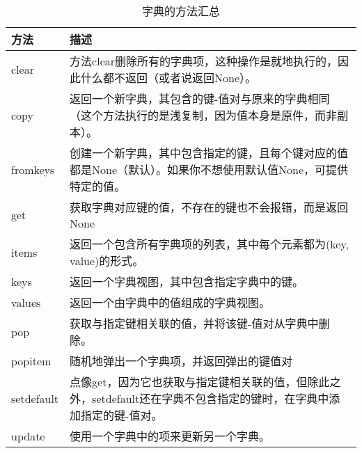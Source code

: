 \begin{table}
    \caption{字典的方法汇总}
    \begin{tabularx}{\textwidth}{lX}
        \hline
        方法         & 描述                                                                \\
        \hline
        clear      & 方法clear删除所有的字典项，这种操作是就地执行的，因此什么都不返回（或者说返回None）。                   \\
        copy       & 返回一个新字典，其包含的键-值对与原来的字典相同（这个方法执行的是浅复制，因为值本身是原件，而非副本）。              \\
        fromkeys   & 创建一个新字典，其中包含指定的键，且每个键对应的值都是None（默认）。如果你不想使用默认值None，可提供特定的值。       \\
        get        & 获取字典对应键的值，不存在的键也不会报错，而是返回None                                     \\
        items      & 返回一个包含所有字典项的列表，其中每个元素都为(key, value)的形式。                           \\
        keys       & 返回一个字典视图，其中包含指定字典中的键。                                             \\
        values     & 返回一个由字典中的值组成的字典视图。                                                \\
        pop        & 获取与指定键相关联的值，并将该键-值对从字典中删除。                                        \\
        popitem    & 随机地弹出一个字典项，并返回弹出的键值对                                              \\
        setdefault & 点像get，因为它也获取与指定键相关联的值，但除此之外，setdefault还在字典不包含指定的键时，在字典中添加指定的键-值对。 \\
        update     & 使用一个字典中的项来更新另一个字典。                                                \\
        \hline
    \end{tabularx}
\end{table}


